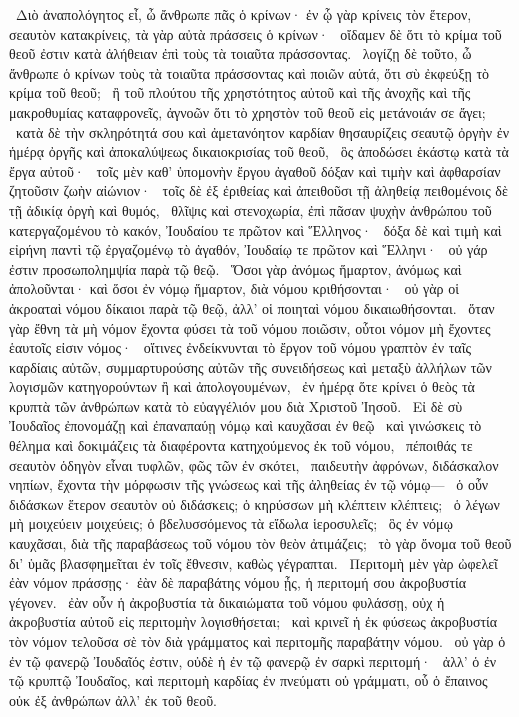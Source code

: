 ~Διὸ ἀναπολόγητος εἶ, ὦ ἄνθρωπε πᾶς ὁ κρίνων· ἐν ᾧ γὰρ κρίνεις τὸν ἕτερον, σεαυτὸν κατακρίνεις, τὰ γὰρ αὐτὰ πράσσεις ὁ κρίνων·
~οἴδαμεν δὲ ὅτι τὸ κρίμα τοῦ θεοῦ ἐστιν κατὰ ἀλήθειαν ἐπὶ τοὺς τὰ τοιαῦτα πράσσοντας.
~λογίζῃ δὲ τοῦτο, ὦ ἄνθρωπε ὁ κρίνων τοὺς τὰ τοιαῦτα πράσσοντας καὶ ποιῶν αὐτά, ὅτι σὺ ἐκφεύξῃ τὸ κρίμα τοῦ θεοῦ;
~ἢ τοῦ πλούτου τῆς χρηστότητος αὐτοῦ καὶ τῆς ἀνοχῆς καὶ τῆς μακροθυμίας καταφρονεῖς, ἀγνοῶν ὅτι τὸ χρηστὸν τοῦ θεοῦ εἰς μετάνοιάν σε ἄγει;
~κατὰ δὲ τὴν σκληρότητά σου καὶ ἀμετανόητον καρδίαν θησαυρίζεις σεαυτῷ ὀργὴν ἐν ἡμέρᾳ ὀργῆς καὶ ἀποκαλύψεως δικαιοκρισίας τοῦ θεοῦ,
~ὃς ἀποδώσει ἑκάστῳ κατὰ τὰ ἔργα αὐτοῦ·
~τοῖς μὲν καθ’ ὑπομονὴν ἔργου ἀγαθοῦ δόξαν καὶ τιμὴν καὶ ἀφθαρσίαν ζητοῦσιν ζωὴν αἰώνιον·
~τοῖς δὲ ἐξ ἐριθείας καὶ ἀπειθοῦσι τῇ ἀληθείᾳ πειθομένοις δὲ τῇ ἀδικίᾳ ὀργὴ καὶ θυμός,
~θλῖψις καὶ στενοχωρία, ἐπὶ πᾶσαν ψυχὴν ἀνθρώπου τοῦ κατεργαζομένου τὸ κακόν, Ἰουδαίου τε πρῶτον καὶ Ἕλληνος·
~δόξα δὲ καὶ τιμὴ καὶ εἰρήνη παντὶ τῷ ἐργαζομένῳ τὸ ἀγαθόν, Ἰουδαίῳ τε πρῶτον καὶ Ἕλληνι·
~οὐ γάρ ἐστιν προσωπολημψία παρὰ τῷ θεῷ.
~Ὅσοι γὰρ ἀνόμως ἥμαρτον, ἀνόμως καὶ ἀπολοῦνται· καὶ ὅσοι ἐν νόμῳ ἥμαρτον, διὰ νόμου κριθήσονται·
~οὐ γὰρ οἱ ἀκροαταὶ νόμου δίκαιοι παρὰ τῷ θεῷ, ἀλλ’ οἱ ποιηταὶ νόμου δικαιωθήσονται.
~ὅταν γὰρ ἔθνη τὰ μὴ νόμον ἔχοντα φύσει τὰ τοῦ νόμου ποιῶσιν, οὗτοι νόμον μὴ ἔχοντες ἑαυτοῖς εἰσιν νόμος·
~οἵτινες ἐνδείκνυνται τὸ ἔργον τοῦ νόμου γραπτὸν ἐν ταῖς καρδίαις αὐτῶν, συμμαρτυρούσης αὐτῶν τῆς συνειδήσεως καὶ μεταξὺ ἀλλήλων τῶν λογισμῶν κατηγορούντων ἢ καὶ ἀπολογουμένων,
~ἐν ἡμέρᾳ ὅτε κρίνει ὁ θεὸς τὰ κρυπτὰ τῶν ἀνθρώπων κατὰ τὸ εὐαγγέλιόν μου διὰ Χριστοῦ Ἰησοῦ.
~Εἰ δὲ σὺ Ἰουδαῖος ἐπονομάζῃ καὶ ἐπαναπαύῃ νόμῳ καὶ καυχᾶσαι ἐν θεῷ
~καὶ γινώσκεις τὸ θέλημα καὶ δοκιμάζεις τὰ διαφέροντα κατηχούμενος ἐκ τοῦ νόμου,
~πέποιθάς τε σεαυτὸν ὁδηγὸν εἶναι τυφλῶν, φῶς τῶν ἐν σκότει,
~παιδευτὴν ἀφρόνων, διδάσκαλον νηπίων, ἔχοντα τὴν μόρφωσιν τῆς γνώσεως καὶ τῆς ἀληθείας ἐν τῷ νόμῳ—
~ὁ οὖν διδάσκων ἕτερον σεαυτὸν οὐ διδάσκεις; ὁ κηρύσσων μὴ κλέπτειν κλέπτεις;
~ὁ λέγων μὴ μοιχεύειν μοιχεύεις; ὁ βδελυσσόμενος τὰ εἴδωλα ἱεροσυλεῖς;
~ὃς ἐν νόμῳ καυχᾶσαι, διὰ τῆς παραβάσεως τοῦ νόμου τὸν θεὸν ἀτιμάζεις;
~τὸ γὰρ ὄνομα τοῦ θεοῦ δι’ ὑμᾶς βλασφημεῖται ἐν τοῖς ἔθνεσιν, καθὼς γέγραπται.
~Περιτομὴ μὲν γὰρ ὠφελεῖ ἐὰν νόμον πράσσῃς· ἐὰν δὲ παραβάτης νόμου ᾖς, ἡ περιτομή σου ἀκροβυστία γέγονεν.
~ἐὰν οὖν ἡ ἀκροβυστία τὰ δικαιώματα τοῦ νόμου φυλάσσῃ, οὐχ ἡ ἀκροβυστία αὐτοῦ εἰς περιτομὴν λογισθήσεται;
~καὶ κρινεῖ ἡ ἐκ φύσεως ἀκροβυστία τὸν νόμον τελοῦσα σὲ τὸν διὰ γράμματος καὶ περιτομῆς παραβάτην νόμου.
~οὐ γὰρ ὁ ἐν τῷ φανερῷ Ἰουδαῖός ἐστιν, οὐδὲ ἡ ἐν τῷ φανερῷ ἐν σαρκὶ περιτομή·
~ἀλλ’ ὁ ἐν τῷ κρυπτῷ Ἰουδαῖος, καὶ περιτομὴ καρδίας ἐν πνεύματι οὐ γράμματι, οὗ ὁ ἔπαινος οὐκ ἐξ ἀνθρώπων ἀλλ’ ἐκ τοῦ θεοῦ.


